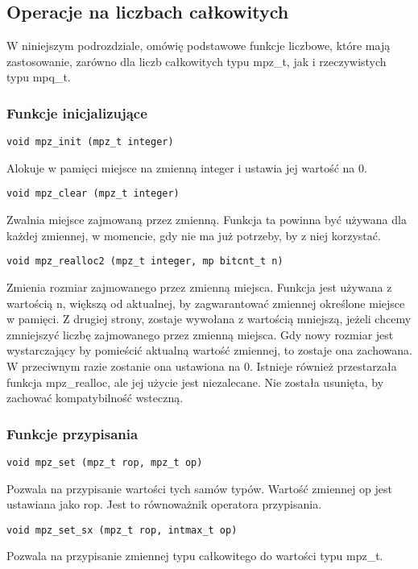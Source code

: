 \documentclass[twoside,a4paper]{book}
\begin{document}
\subsection{Operacje na liczbach całkowitych}
W niniejszym podrozdziale, omówię podstawowe funkcje liczbowe, które mają zastosowanie, zarówno dla liczb całkowitych typu mpz\_t, jak i rzeczywistych typu mpq\_t.

\subsubsection{Funkcje inicjalizujące}
\begin{lstlisting}
void mpz_init (mpz_t integer)
\end{lstlisting}
Alokuje w pamięci miejsce na zmienną integer i ustawia jej wartość na 0.

\begin{lstlisting}
void mpz_clear (mpz_t integer)
\end{lstlisting}
Zwalnia miejsce zajmowaną przez zmienną. Funkcja ta powinna być używana dla każdej zmiennej, w momencie, gdy nie ma już potrzeby, by z niej korzystać.

\begin{lstlisting}
void mpz_realloc2 (mpz_t integer, mp bitcnt_t n)
\end{lstlisting}
Zmienia rozmiar zajmowanego przez zmienną miejsca. Funkcja jest używana z wartością n, większą od aktualnej, by zagwarantować zmiennej określone miejsce w pamięci. Z drugiej strony, zostaje wywołana z wartością mniejszą, jeżeli chcemy zmniejszyć liczbę zajmowanego przez zmienną miejsca. Gdy nowy rozmiar jest wystarczający by pomieścić aktualną wartość zmiennej, to zostaje ona zachowana. W przeciwnym razie zostanie ona ustawiona na 0. Istnieje również przestarzała funkcja mpz\_realloc, ale jej użycie jest niezalecane. Nie została usunięta, by zachować kompatybilność wsteczną.

\subsubsection{Funkcje przypisania}

\begin{lstlisting}
void mpz_set (mpz_t rop, mpz_t op)
\end{lstlisting}
Pozwala na przypisanie wartości tych samów typów. Wartość zmiennej op jest ustawiana jako rop. Jest to równoważnik operatora przypisania.

\begin{lstlisting}
void mpz_set_sx (mpz_t rop, intmax_t op)
\end{lstlisting}
Pozwala na przypisanie zmiennej typu całkowitego do wartości typu mpz\_t.
\end{document}
